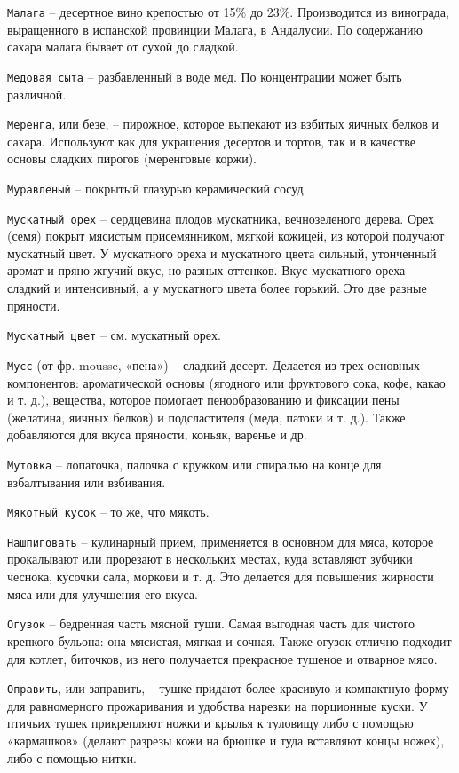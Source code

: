 {\tt Малага} – десертное вино крепостью от 15\% до 23\%. Производится из винограда, выращенного в испанской провинции Малага, в Андалусии. По содержанию сахара малага бывает от сухой до сладкой.

{\tt Медовая сыта} – разбавленный в воде мед. По концентрации может быть различной.

{\tt Меренга}, или безе, – пирожное, которое выпекают из взбитых яичных белков и сахара. Используют как для украшения десертов и тортов, так и в качестве основы сладких пирогов (меренговые коржи).

{\tt Муравленый} – покрытый глазурью керамический сосуд.

{\tt Мускатный орех} – сердцевина плодов мускатника, вечнозеленого дерева. Орех (семя) покрыт мясистым присемянником, мягкой кожицей, из которой получают мускатный цвет. У мускатного ореха и мускатного цвета сильный, утонченный аромат и пряно-жгучий вкус, но разных оттенков. Вкус мускатного ореха – сладкий и интенсивный, а у мускатного цвета более горький. Это две разные пряности.

{\tt Мускатный цвет} – см. мускатный орех.

{\tt Мусс} (от фр. mousse, «пена») – сладкий десерт. Делается из трех основных компонентов: ароматической основы (ягодного или фруктового сока, кофе, какао и т. д.), вещества, которое помогает пенообразованию и фиксации пены (желатина, яичных белков) и подсластителя (меда, патоки и т. д.). Также добавляются для вкуса пряности, коньяк, варенье и др.

{\tt Мутовка} – лопаточка, палочка с кружком или спиралью на конце для взбалтывания или взбивания.

{\tt Мякотный кусок} – то же, что мякоть.

{\tt Нашпиговать} – кулинарный прием, применяется в основном для мяса, которое прокалывают или прорезают в нескольких местах, куда вставляют зубчики чеснока, кусочки сала, моркови и т. д. Это делается для повышения жирности мяса или для улучшения его вкуса.

{\tt Огузок} – бедренная часть мясной туши. Самая выгодная часть для чистого крепкого бульона: она мясистая, мягкая и сочная. Также огузок отлично подходит для котлет, биточков, из него получается прекрасное тушеное и отварное мясо. 

{\tt Оправить}, или заправить, – тушке придают более красивую и компактную форму для равномерного прожаривания и удобства нарезки на порционные куски. У птичьих тушек прикрепляют ножки и крылья к туловищу либо с помощью «кармашков» (делают разрезы кожи на брюшке и туда вставляют концы ножек), либо с помощью нитки.

